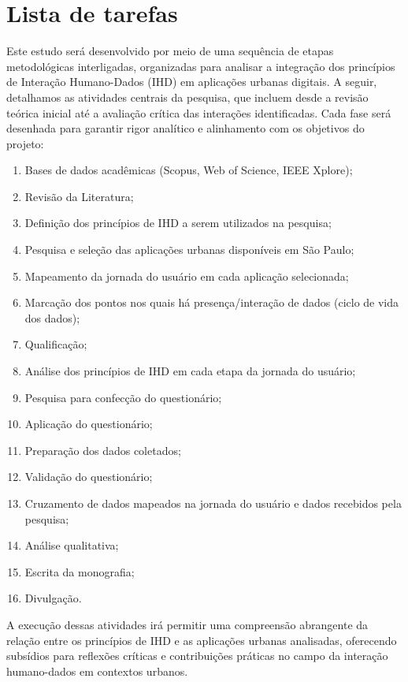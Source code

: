 \documentclass[
	12pt,				%
	oneside,			%
	a4paper,			%
	english,			%
	brazil				%
	]{abntex2ppgsi}
\begin{document}
  \section{Lista de tarefas}
    Este estudo será desenvolvido por meio de uma sequência de etapas metodológicas interligadas, organizadas para analisar a integração dos princípios de Interação Humano-Dados (IHD) em aplicações urbanas digitais. A seguir, detalhamos as atividades centrais da pesquisa, que incluem desde a revisão teórica inicial até a avaliação crítica das interações identificadas. Cada fase será desenhada para garantir rigor analítico e alinhamento com os objetivos do projeto:
    \begin{enumerate}
        \item Bases de dados acadêmicas (Scopus, Web of Science, IEEE Xplore);
        \item Revisão da Literatura;  
        \item Definição dos princípios de IHD a serem utilizados na pesquisa;
        \item Pesquisa e seleção das aplicações urbanas disponíveis em São Paulo;
        \item Mapeamento da jornada do usuário em cada aplicação selecionada;
        \item Marcação dos pontos nos quais há presença/interação de dados (ciclo de vida dos dados);
        \item Qualificação;
        \item Análise dos princípios de IHD em cada etapa da jornada do usuário;
        \item Pesquisa para confecção do questionário;
        \item Aplicação do questionário;
        \item Preparação dos dados coletados;
        \item Validação do questionário;
        \item Cruzamento de dados mapeados na jornada do usuário e dados recebidos pela pesquisa;
        \item Análise qualitativa;
        \item Escrita da monografia;
        \item Divulgação.
    \end{enumerate}

     A execução dessas atividades irá permitir uma compreensão abrangente da relação entre os princípios de IHD e as aplicações urbanas analisadas, oferecendo subsídios para reflexões críticas e contribuições práticas no campo da interação humano-dados em contextos urbanos.
\end{document}
